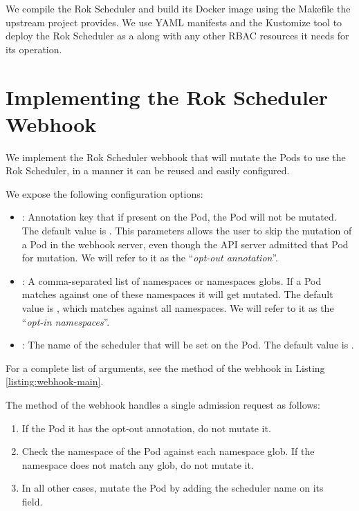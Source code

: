 


We compile the Rok Scheduler and build its Docker image using the Makefile the
upstream project provides. We use YAML manifests and the Kustomize tool to
deploy the Rok Scheduler as a  along with any other RBAC
resources it needs for its operation.

\section{Implementing the Rok Scheduler Webhook}

We implement the Rok Scheduler webhook that will mutate the Pods to use the Rok
Scheduler, in a manner it can be reused and easily configured. 

We expose the following configuration options:
\begin{itemize}
      \item {}:  Annotation key that if present
            on the Pod, the Pod will not be mutated. The default value is
            . This parameters allows
            the user to skip the mutation of a Pod in the webhook server, even
            though the API server admitted that Pod for mutation. We will refer
            to it as the ``\textit{opt-out annotation}''.
      \item {}: A comma-separated list of
            namespaces or namespaces globs. If a Pod matches against one of
            these namespaces it will get mutated. The default value is
            , which matches against all namespaces. We will refer to
            it as the ``\textit{opt-in namespaces}''.
      \item {}: The name of the scheduler that will
            be set on the Pod. The default  value is .
\end{itemize}
For a complete list of arguments, see the  method of the webhook in
Listing \ref{listing:webhook-main}.

The  method of the webhook handles a single admission request as
follows:
\begin{enumerate}
      \tightlist
      \item If the Pod it has the opt-out annotation, do not mutate it.
      \item Check the namespace of the Pod against each namespace glob. If
            the namespace does not match any glob, do not mutate it.
      \item In all other cases, mutate the Pod by adding the scheduler name on
            its \\  field.
\end{enumerate}

